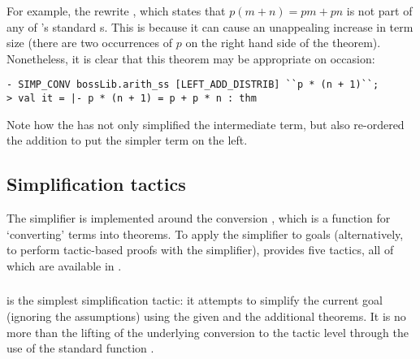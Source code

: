{For example, the rewrite , which
states that $p(m + n) = pm + pn$ is not part of any of \HOL's standard
\simpset{}s.  This is because it can cause an unappealing increase in
term size (there are two occurrences of $p$ on the right hand
side of the theorem).  Nonetheless, it is clear that this theorem may
be appropriate on occasion:
\begin{session}
\begin{hol}
\begin{verbatim}
- SIMP_CONV bossLib.arith_ss [LEFT_ADD_DISTRIB] ``p * (n + 1)``;
> val it = |- p * (n + 1) = p + p * n : thm
\end{verbatim}
\end{hol}
\end{session}
Note how the  \simpset{} has not only simplified the
intermediate  term, but also re-ordered the addition to
put the simpler term on the left.

\subsection{Simplification tactics}
\label{sec:simplification-tactics}

The simplifier is implemented around the conversion ,
which is a function for `converting' terms into theorems.  To apply
the simplifier to goals (alternatively, to perform tactic-based proofs
with the simplifier), \HOL{} provides five tactics, all of which are
available in .

\subsubsection{}

 is the simplest simplification tactic: it attempts to
simplify the current goal (ignoring the assumptions) using the given
\simpset{} and the additional theorems.  It is no more than the
lifting of the underlying  conversion to the tactic
level through the use of the standard function .

\subsubsection{}

}
